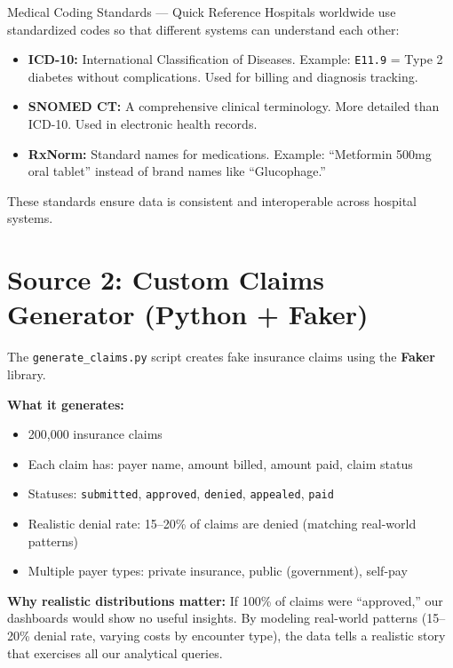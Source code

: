 \documentclass[12pt, a4paper, oneside]{report}
\begin{document}
\begin{conceptbox}{Medical Coding Standards --- Quick Reference}
Hospitals worldwide use standardized codes so that different systems can understand each other:
\begin{itemize}
    \item \textbf{ICD-10:} International Classification of Diseases. Example: \texttt{E11.9} = Type 2 diabetes without complications. Used for billing and diagnosis tracking.
    \item \textbf{SNOMED CT:} A comprehensive clinical terminology. More detailed than ICD-10. Used in electronic health records.
    \item \textbf{RxNorm:} Standard names for medications. Example: ``Metformin 500mg oral tablet'' instead of brand names like ``Glucophage.''
\end{itemize}
These standards ensure data is consistent and interoperable across hospital systems.
\end{conceptbox}

\section{Source 2: Custom Claims Generator (Python + Faker)}

The \texttt{generate\_claims.py} script creates fake insurance claims using the \textbf{Faker} library.

\textbf{What it generates:}
\begin{itemize}
    \item 200,000 insurance claims
    \item Each claim has: payer name, amount billed, amount paid, claim status
    \item Statuses: \texttt{submitted}, \texttt{approved}, \texttt{denied}, \texttt{appealed}, \texttt{paid}
    \item Realistic denial rate: 15--20\% of claims are denied (matching real-world patterns)
    \item Multiple payer types: private insurance, public (government), self-pay
\end{itemize}

\begin{tipbox}
    \textbf{Why realistic distributions matter:} If 100\% of claims were ``approved,'' our dashboards would show no useful insights. By modeling real-world patterns (15--20\% denial rate, varying costs by encounter type), the data tells a realistic story that exercises all our analytical queries.
\end{tipbox}
\end{document}
